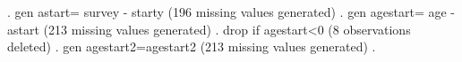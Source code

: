 . gen astart= survey - starty
(196 missing values generated)
{\smallskip}
. gen agestart= age - astart
(213 missing values generated)
{\smallskip}
. drop if agestart<0
(8 observations deleted)
{\smallskip}
. gen agestart2=agestart{\caret}2
(213 missing values generated)
{\smallskip}
. 
